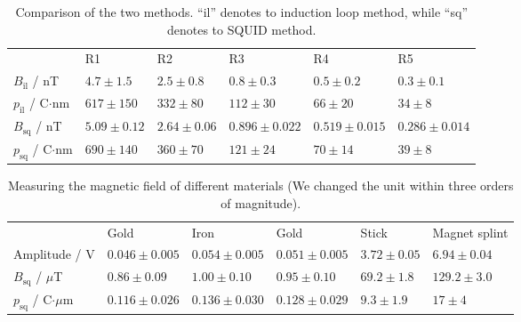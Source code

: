 \begin{table}[htb]
\caption{Comparison of the two methods. ``il'' denotes to induction loop method, while ``sq'' denotes to SQUID method.}
\begin{tabular}{ l| p{2.3cm}|p{2.3cm}|p{2.3cm}|p{2.3cm}|p{2.3cm}}
 \rowcolor{tabcolor}& R1 & R2 & R3 & R4 & R5 \\ 
$B_{\mathrm{il}}$ / nT &$4.7\pm1.5$&$2.5\pm0.8$&$0.8\pm0.3$&$0.5\pm0.2$&$0.3\pm0.1$ \\ 
$p_{\mathrm{il}}$ / C$\cdot$nm&$617 \pm 150$&$332 \pm 80$&$112 \pm 30$&$66 \pm 20$&$34 \pm 8$\\ \hline
$B_{\mathrm{sq}}$ / nT &$5.09 \pm 0.12$&$2.64 \pm 0.06$&$0.896 \pm 0.022$&$0.519 \pm 0.015$&$0.286 \pm 0.014$\\  
$p_{\mathrm{sq}}$ / C$\cdot$nm &$690 \pm 140$ & $360 \pm 70$ &$121 \pm 24$ & $70 \pm 14$ & $39 \pm 8$ \\ 
\end{tabular}
\end{table}

\begin{table}[htb]
\caption{Measuring the magnetic field of different materials (We changed the unit within three orders of magnitude).}
\begin{tabular}{ l| p{2.3cm}|p{2.3cm}|p{2.3cm}|p{2.3cm}|p{2.3cm}}
 \rowcolor{tabcolor}& Gold & Iron & Gold  & Stick & Magnet splint \\ 
Amplitude / V &$0.046 \pm 0.005$&$0.054 \pm 0.005$&$0.051 \pm 0.005$&$3.72 \pm 0.05$&$6.94 \pm 0.04$\\
$B_{\mathrm{sq}}$ / $\mu$T  &$0.86 \pm 0.09$ &$1.00 \pm 0.10$ &$0.95 \pm 0.10$ &$69.2 \pm 1.8$ &$129.2 \pm 3.0$ \\ 
$p_{\mathrm{sq}}$ / C$\cdot\mu$m  &$0.116 \pm 0.026$&$0.136 \pm 0.030$&$0.128 \pm 0.029$&$9.3 \pm 1.9$&$17 \pm 4$\\
\end{tabular}
\end{table}









